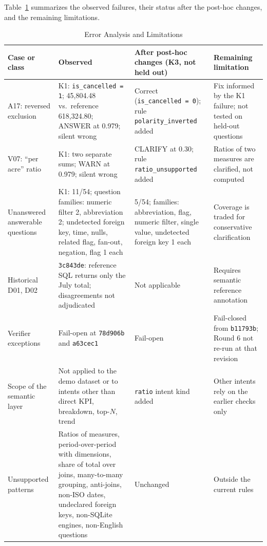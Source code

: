 \documentclass[conference]{IEEEtran}
\begin{document}
Table~\ref{tab:errors} summarizes the observed failures, their status after the post-hoc changes, and the remaining limitations.

\begin{table}[!t]
\caption{Error Analysis and Limitations}
\label{tab:errors}
\centering
\footnotesize
\setlength{\tabcolsep}{3pt}
\begin{tabular}{@{}>{\raggedright}p{}>{\raggedright}p{}>{\raggedright}p{}>{\raggedright\arraybackslash}p{}@{}}
\toprule
\textbf{Case or class} & \textbf{Observed} & \textbf{After post-hoc changes (K3, not held out)} & \textbf{Remaining limitation} \\
\midrule
A17: reversed exclusion & K1: \texttt{is\_\allowbreak{}cancelled = 1}; 45,804.48 vs.\ reference 618,324.80; ANSWER at 0.979; silent wrong & Correct (\texttt{is\_\allowbreak{}cancelled = 0}); rule \texttt{polarity\_\allowbreak{}inverted} added & Fix informed by the K1 failure; not tested on held-out questions \\
V07: ``per acre'' ratio & K1: two separate sums; WARN at 0.979; silent wrong & CLARIFY at 0.30; rule \texttt{ratio\_\allowbreak{}unsupported} added & Ratios of two measures are clarified, not computed \\
Unanswered answerable questions & K1: 11/54; question families: numeric filter 2, abbreviation 2; undetected foreign key, time, nulls, related flag, fan-out, negation, flag 1 each & 5/54; families: abbreviation, flag, numeric filter, single value, undetected foreign key 1 each & Coverage is traded for conservative clarification \\
Historical D01, D02 & \texttt{3c843de}: reference SQL returns only the July total; disagreements not adjudicated & Not applicable & Requires semantic reference annotation \\
Verifier exceptions & Fail-open at \texttt{78d906b} and \texttt{a63cec1} & Fail-open & Fail-closed from \texttt{b11793b}; Round 6 not re-run at that revision \\
Scope of the semantic layer & Not applied to the demo dataset or to intents other than direct KPI, breakdown, top-$N$, trend & \texttt{ratio} intent kind added & Other intents rely on the earlier checks only \\
Unsupported patterns & Ratios of measures, period-over-period with dimensions, share of total over joins, many-to-many grouping, anti-joins, non-ISO dates, undeclared foreign keys, non-SQLite engines, non-English questions & Unchanged & Outside the current rules \\
\bottomrule
\end{tabular}
\end{table}
\end{document}
